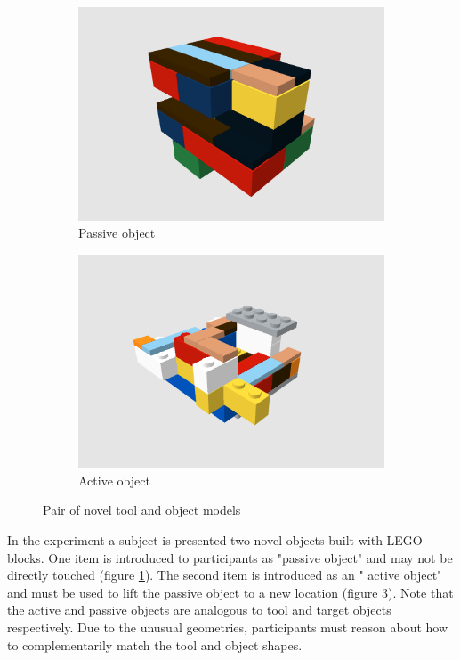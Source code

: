 \documentclass[11]{article}
\begin{document}
\begin{figure}[!h]
  \centering
  \begin{subfigure}{0.49\textwidth}
    \includegraphics[width=1\linewidth]{figures/obj51.png}
    \caption{Passive object}
    \label{fig:obj51}
  \end{subfigure}
  \begin{subfigure}{0.49\textwidth}
    \includegraphics[width=1\linewidth]{figures/obj52.png}
    \caption{Active object}
    \label{fig:obj52}
  \end{subfigure}
  \caption{Pair of novel tool and object models}
\end{figure}

In the experiment a subject is presented two novel objects built with LEGO blocks.
One item is introduced to participants as "passive object" and may not be directly touched (figure \ref{fig:obj51}).
The second item is introduced as an " active object" and must be used to lift the passive object to a new location (figure \ref{fig:obj52}).
Note that the active and passive objects are analogous to tool and target objects respectively.
Due to the unusual geometries, participants must reason about how to complementarily match the tool and object shapes.
\end{document}
